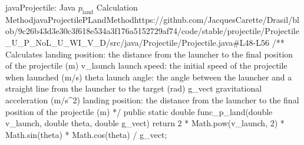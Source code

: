 \begin{codeSnippet}{java}{Projectile: Java \(p_\text{land}\) Calculation Method}{javaProjectilePLandMethod}{https://github.com/JacquesCarette/Drasil/blob/9c26b43d3e30c3f618e534a3f176a5152729af74/code/stable/projectile/Projectile_U_P_NoL_U_WI_V_D/src/java/Projectile/Projectile.java\#L48-L56}
/** \brief Calculates landing position: the distance from the launcher to the final position of the projectile (m)
    \param v_launch launch speed: the initial speed of the projectile when launched (m/s)
    \param theta launch angle: the angle between the launcher and a straight line from the launcher to the target (rad)
    \param g_vect gravitational acceleration (m/s^2)
    \return landing position: the distance from the launcher to the final position of the projectile (m)
*/
public static double func_p_land(double v_launch, double theta, double g_vect) {
    return 2 * Math.pow(v_launch, 2) * Math.sin(theta) * Math.cos(theta) / g_vect;
}
\end{codeSnippet}
